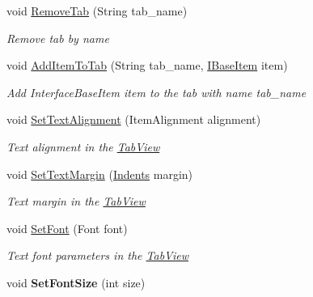 \begin{DoxyCompactItemize}
void \mbox{\hyperlink{class_space_v_i_l_1_1_tab_view_a5ea4b28772c302bc05b558ac104ea831}{Remove\+Tab}} (String tab\+\_\+name)
\begin{DoxyCompactList}\small\item\em Remove tab by name \end{DoxyCompactList}\item 
void \mbox{\hyperlink{class_space_v_i_l_1_1_tab_view_a1372d1fa43f967c2c7f8f5f11fa5b214}{Add\+Item\+To\+Tab}} (String tab\+\_\+name, \mbox{\hyperlink{interface_space_v_i_l_1_1_core_1_1_i_base_item}{I\+Base\+Item}} item)
\begin{DoxyCompactList}\small\item\em Add Interface\+Base\+Item item to the tab with name tab\+\_\+name \end{DoxyCompactList}\item 
void \mbox{\hyperlink{class_space_v_i_l_1_1_tab_view_abdd2253b42ef61e32efb3115c679bbc5}{Set\+Text\+Alignment}} (Item\+Alignment alignment)
\begin{DoxyCompactList}\small\item\em Text alignment in the \mbox{\hyperlink{class_space_v_i_l_1_1_tab_view}{Tab\+View}} \end{DoxyCompactList}\item 
void \mbox{\hyperlink{class_space_v_i_l_1_1_tab_view_af857743fb5c8b39d4090b5ae49f7abd5}{Set\+Text\+Margin}} (\mbox{\hyperlink{struct_space_v_i_l_1_1_decorations_1_1_indents}{Indents}} margin)
\begin{DoxyCompactList}\small\item\em Text margin in the \mbox{\hyperlink{class_space_v_i_l_1_1_tab_view}{Tab\+View}} \end{DoxyCompactList}\item 
void \mbox{\hyperlink{class_space_v_i_l_1_1_tab_view_a11d514c4024aae136840d60b14b61e3c}{Set\+Font}} (Font font)
\begin{DoxyCompactList}\small\item\em Text font parameters in the \mbox{\hyperlink{class_space_v_i_l_1_1_tab_view}{Tab\+View}} \end{DoxyCompactList}\item 
\mbox{\label{class_space_v_i_l_1_1_tab_view_a79db651164f9bc85e4c8a56272164127}} 
void {\bfseries Set\+Font\+Size} (int size)
\item 
\mbox{\label{class_space_v_i_l_1_1_tab_view_aa7b1747dce9403d6aed324d7f2ba959e}} 

\end{DoxyCompactItemize}
